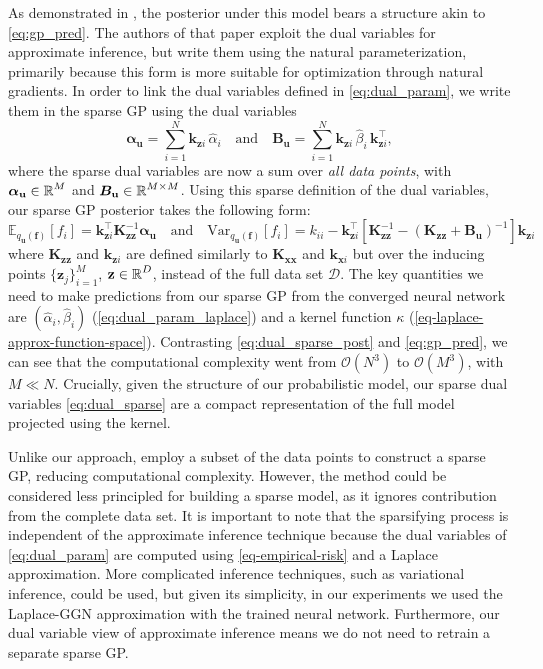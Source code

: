 \documentclass{article}
\newcommand{\dataset}{\ensuremath{\mathcal{D}}}
\newcommand{\mathbold}[1]{\bm{#1}}
\newcommand{\mbf}[1]{\mathbf{#1}}
\newcommand{\T}{\top}
\newcommand{\valpha}[0]{\mathbold{\alpha}}
\newcommand{\MBeta}[0]{\mathbold{B}}
\newcommand{\vz}{\mbf{z}}
\newcommand{\vf}{\mbf{f}}
\newcommand{\vu}{\mbf{u}}
\newcommand{\vx}{\mbf{x}}
\newcommand{\MKzz}{\mbf{K}_{\mbf{z}\mbf{z}}}
\newcommand{\MKxx}{\mbf{K}_{\mbf{x}\mbf{x}}}
\newcommand{\vkzi}{\mbf{k}_{\mbf{z}i}}
\newcommand{\vkzs}{\mbf{k}_{\mbf{z}i}}
\newcommand{\vk}{\mbf{k}}
\newcommand{\myexpect}{\mathbb{E}}
\begin{document}
As demonstrated in \cite{adam2021dual}, the posterior under this model bears a structure akin to \cref{eq:gp_pred}. The authors of that paper exploit the dual variables for approximate inference, but write them using the natural parameterization, primarily because this form is more suitable for optimization through natural gradients. In order to link the dual variables defined in \cref{eq:dual_param}, we write them in the sparse GP using the dual variables
%
\begin{equation} \textstyle
  \valpha_{\vu}  =  \sum_{i=1}^N  \vkzi \, \hat{\alpha}_{i}
  \quad \text{and} \quad
  \MBeta_{\vu} =  \sum_{i=1}^N \vkzi \,\hat{\beta}_{i} \, \vkzi^{\T} ,    
\label{eq:dual_sparse}
\end{equation}
%
where the sparse dual variables are now a sum over \emph{all data points}, with $\valpha_{\vu} \in \R^{M}$ and $\MBeta_{\vu} \in \R^{M  \times M}$. Using this sparse definition of the dual variables, our sparse GP posterior takes the following form:
\begin{equation}\label{eq:dual_sparse_post}
   \myexpect_{q_{\vu}(\vf)}[f_i] = \vkzs^{\T} \MKzz^{-1} \valpha_{\vu}
   \quad \text{and} \quad 
   \textrm{Var}_{q_{\vu}(\vf)}[f_i]  = k_{ii} - \vkzs^\top [\MKzz^{-1} - (\MKzz + \MBeta_{\vu})^{-1} ]\vkzs
\end{equation}
where $\MKzz$ and $\vkzs$ are defined similarly to $\MKxx$ and $\vk_{\vx i}$ but over the inducing points $\{\vz_j\}_{i=1}^M$, $\vz \in \R^{D}$, instead of the full data set $\dataset$. The key quantities we need to make predictions from our sparse GP from the converged neural network are $(\hat{\alpha}_i, \hat{\beta}_i)$ (\cref{eq:dual_param_laplace}) and a kernel function $\kappa$ (\cref{eq-laplace-approx-function-space}). Contrasting \cref{eq:dual_sparse_post} and \cref{eq:gp_pred}, we can see that the computational complexity went from $\mathcal{O}(N^3)$ to $\mathcal{O}(M^3)$, with $M \ll N$.  Crucially, given the structure of our probabilistic model, our sparse dual variables \cref{eq:dual_sparse} are a compact representation of the full model projected using the kernel. 

Unlike our approach, \citet{immer2021improving} employ a subset of the data points to construct a sparse GP, reducing computational complexity. However, the method could be considered less principled for building a sparse model, as it ignores contribution from the complete data set. It is important to note that the sparsifying process is independent of the approximate inference technique because the dual variables of \cref{eq:dual_param} are computed using \cref{eq-empirical-risk} and a Laplace approximation. More complicated inference techniques, such as variational inference, could be used, but given its simplicity, in our experiments we used the Laplace-GGN approximation with the trained neural network. Furthermore, our dual variable view of approximate inference means we do not need to retrain a separate sparse GP.
\end{document}
